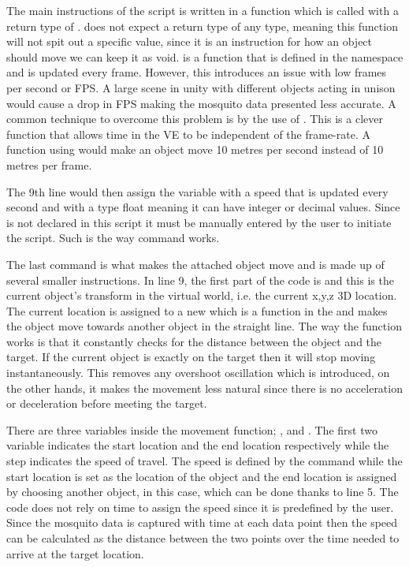 The main instructions of the script is written in a function which is called  with a return type of .  does not expect a return type of any type, meaning this function will not spit out a specific value, since it is an instruction for how an object should move we can keep it as void.  is a function that is defined in the namespace  and is updated every frame. However, this introduces an issue with low frames per second or FPS. A large scene in unity with different objects acting in unison would cause a drop in FPS making the mosquito data presented less accurate. A common technique to overcome this problem is by the use of . This is a clever function that allows time in the VE to be independent of the frame-rate. A function using  would make an object move 10 metres per second instead of 10 metres per frame. 

The 9th line would then assign the variable  with a speed that is updated every second and with a type float meaning it can have integer or decimal values. Since  is not declared in this script it must be manually entered by the user to initiate the script. Such is the way  command works. 

The last command is what makes the attached object move and is made up of several smaller instructions. In line 9, the first part of the code is  and this is the current object's transform in the virtual world, i.e. the current x,y,z 3D location. The current location is assigned to a new  which is a function in the  and makes the object move towards another object in the straight line. The way the function works is that it constantly checks for the distance between the object and the target. If the current object is exactly on the target then it will stop moving instantaneously. This removes any overshoot oscillation which is introduced, on the other hands, it makes the movement less natural since there is no acceleration or deceleration before meeting the target. 

There are three variables inside the movement function; ,  and . The first two variable indicates the start location and the end location respectively while the step indicates the speed of travel. The speed is defined by the  command while the start location is set as the location of the object and the end location is assigned by choosing another object, in this case, which can be done thanks to line 5. The code does not rely on time to assign the speed since it is predefined by the user. Since the mosquito data is captured with time at each data point then the speed can be calculated as the distance between the two points over the time needed to arrive at the target location.

